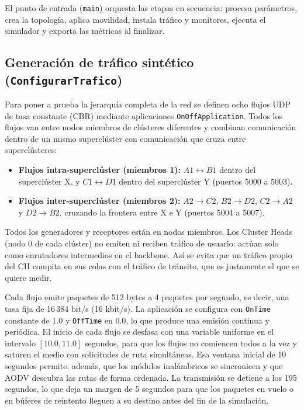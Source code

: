 El punto de entrada (\texttt{main}) orquesta las etapas en secuencia: procesa parámetros, crea la topología, aplica movilidad, instala tráfico y monitores, ejecuta el simulador y exporta las métricas al finalizar.

\subsection{Generación de tráfico sintético (\texttt{ConfigurarTrafico})}

Para poner a prueba la jerarquía completa de la red se definen ocho flujos UDP de tasa constante (CBR) mediante aplicaciones \texttt{OnOffApplication}. Todos los flujos van entre nodos miembros de clústeres diferentes y combinan comunicación dentro de un mismo superclúster con comunicación que cruza entre superclústeres:

\begin{itemize}
    \item \textbf{Flujos intra-superclúster (miembros 1):} $A1 \leftrightarrow B1$ dentro del superclúster X, y $C1 \leftrightarrow D1$ dentro del superclúster Y (puertos 5000 a 5003).
    \item \textbf{Flujos inter-superclúster (miembros 2):} $A2 \rightarrow C2$, $B2 \rightarrow D2$, $C2 \rightarrow A2$ y $D2 \rightarrow B2$, cruzando la frontera entre X e Y (puertos 5004 a 5007).
\end{itemize}

Todos los generadores y receptores están en nodos miembros. Los Cluster Heads (nodo 0 de cada clúster) no emiten ni reciben tráfico de usuario: actúan solo como enrutadores intermedios en el backbone. Así se evita que un tráfico propio del CH compita en sus colas con el tráfico de tránsito, que es justamente el que se quiere medir.

Cada flujo emite paquetes de 512 bytes a 4 paquetes por segundo, es decir, una tasa fija de 16\,384 bit/s (16 kbit/s). La aplicación se configura con \texttt{OnTime} constante de 1.0 y \texttt{OffTime} en 0.0, lo que produce una emisión continua y periódica. El inicio de cada flujo se desfasa con una variable uniforme en el intervalo $[10.0, 11.0]$ segundos, para que los flujos no comiencen todos a la vez y saturen el medio con solicitudes de ruta simultáneas. Esa ventana inicial de 10 segundos permite, además, que los módulos inalámbricos se sincronicen y que AODV descubra las rutas de forma ordenada. La transmisión se detiene a los 195 segundos, lo que deja un margen de 5 segundos para que los paquetes en vuelo o en búferes de reintento lleguen a su destino antes del fin de la simulación.

